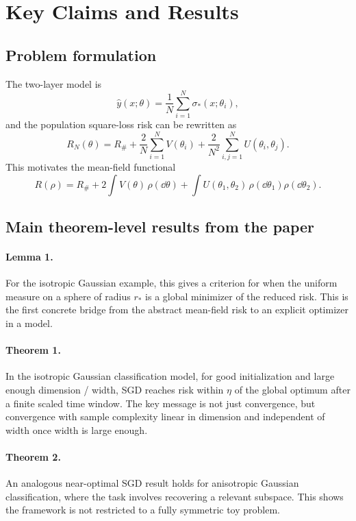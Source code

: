 \section{Key Claims and Results}

\subsection*{Problem formulation}
The two-layer model is
\begin{equation}
\hat y(x;\theta)=\frac{1}{N}\sum_{i=1}^N \sigma_*(x;\theta_i),
\end{equation}
and the population square-loss risk can be rewritten as
\begin{equation}
R_N(\theta)
=
R_\# + \frac{2}{N}\sum_{i=1}^N V(\theta_i)
+ \frac{2}{N^2}\sum_{i,j=1}^N U(\theta_i,\theta_j).
\end{equation}
This motivates the mean-field functional
\begin{equation}
R(\rho)=R_\# + 2\int V(\theta)\,\rho(\dd\theta)
+ \int U(\theta_1,\theta_2)\,\rho(\dd\theta_1)\rho(\dd\theta_2).
\end{equation}

\subsection*{Main theorem-level results from the paper}

\paragraph{Lemma 1.}
For the isotropic Gaussian example, this gives a criterion for when the uniform measure on a sphere of radius $r_*$ is a global minimizer of the reduced risk. This is the first concrete bridge from the abstract mean-field risk to an explicit optimizer in a model.

\paragraph{Theorem 1.}
In the isotropic Gaussian classification model, for good initialization and large enough dimension / width, SGD reaches risk within $\eta$ of the global optimum after a finite scaled time window. The key message is not just convergence, but convergence with sample complexity linear in dimension and independent of width once width is large enough.

\paragraph{Theorem 2.}
An analogous near-optimal SGD result holds for anisotropic Gaussian classification, where the task involves recovering a relevant subspace. This shows the framework is not restricted to a fully symmetric toy problem.


